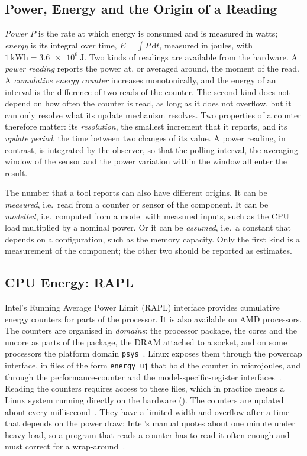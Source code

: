 \subsection{Power, Energy and the Origin of a Reading}\label{sec:power-energy}

\emph{Power} $P$ is the rate at which energy is consumed and is measured in watts; \emph{energy} is its integral over time, $E = \int P\,\mathrm{d}t$, measured in joules, with $\SI{1}{\kilo\watt\hour} = \SI{3.6e6}{\joule}$.
Two kinds of readings are available from the hardware.
A \emph{power reading} reports the power at, or averaged around, the moment of the read.
A \emph{cumulative energy counter} increases monotonically, and the energy of an interval is the difference of two reads of the counter.
The second kind does not depend on how often the counter is read, as long as it does not overflow, but it can only resolve what its update mechanism resolves.
Two properties of a counter therefore matter: its \emph{resolution}, the smallest increment that it reports, and its \emph{update period}, the time between two changes of its value.
A power reading, in contrast, is integrated by the observer, so that the polling interval, the averaging window of the sensor and the power variation within the window all enter the result.

The number that a tool reports can also have different origins.
It can be \emph{measured}, i.e.\ read from a counter or sensor of the component.
It can be \emph{modelled}, i.e.\ computed from a model with measured inputs, such as the CPU load multiplied by a nominal power.
Or it can be \emph{assumed}, i.e.\ a constant that depends on a configuration, such as the memory capacity.
Only the first kind is a measurement of the component; the other two should be reported as estimates.

\subsection{CPU Energy: RAPL}\label{sec:rapl}

Intel's Running Average Power Limit (RAPL) interface provides cumulative energy counters for parts of the processor.
It is also available on AMD processors.
The counters are organised in \emph{domains}: the processor package, the cores and the uncore as parts of the package, the DRAM attached to a socket, and on some processors the platform domain \texttt{psys}~\cite{raffin2024dissecting}.
Linux exposes them through the powercap interface, in files of the form \texttt{energy\_uj} that hold the counter in microjoules, and through the performance-counter and the model-specific-register interfaces~\cite{raffin2024dissecting}.
Reading the counters requires access to these files, which in practice means a Linux system running directly on the hardware ().
The counters are updated about every millisecond~\cite{jay2023softwaremeters}.
They have a limited width and overflow after a time that depends on the power draw; Intel's manual quotes about one minute under heavy load, so a program that reads a counter has to read it often enough and must correct for a wrap-around~\cite{raffin2024dissecting}.

